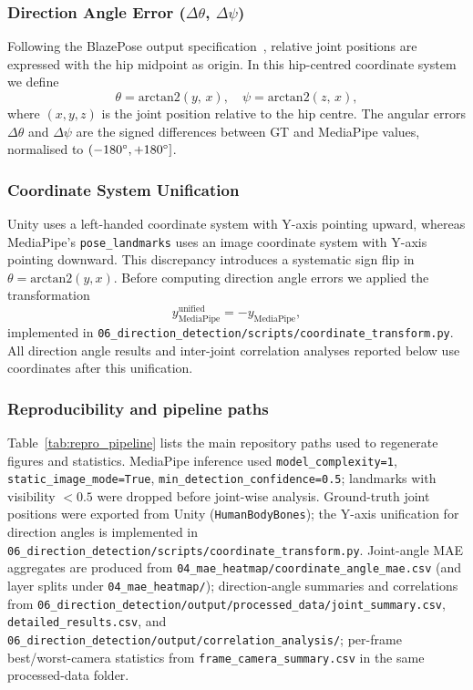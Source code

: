\documentclass[twocolumn]{article}
\begin{document}
\subsubsection{Direction Angle Error ($\Delta\theta$, $\Delta\psi$)}

Following the BlazePose output specification~\cite{blazepose}, relative
joint positions are expressed with the hip midpoint as origin. In this
hip-centred coordinate system we define
\[
  \theta = \mathrm{arctan2}(y,\,x), \quad
  \psi   = \mathrm{arctan2}(z,\,x),
\]
where $(x,y,z)$ is the joint position relative to the hip centre.
The angular errors $\Delta\theta$ and $\Delta\psi$ are the signed
differences between GT and MediaPipe values, normalised to
$(-180\degree{}, +180\degree{}]$.

\subsubsection{Coordinate System Unification}

Unity uses a left-handed coordinate system with Y-axis pointing
upward, whereas MediaPipe's \texttt{pose\_landmarks} uses an image
coordinate system with Y-axis pointing downward. This discrepancy
introduces a systematic sign flip in $\theta = \mathrm{arctan2}(y,x)$.
Before computing direction angle errors we applied the transformation
\[
  y_{\text{MediaPipe}}^{\text{unified}} = -y_{\text{MediaPipe}},
\]
implemented in
\texttt{06\_direction\_detection/scripts/coordinate\_transform.py}.
All direction angle results and inter-joint correlation analyses reported
below use coordinates after this unification.

\subsubsection{Reproducibility and pipeline paths}

Table~\ref{tab:repro_pipeline} lists the main repository paths used to
regenerate figures and statistics. MediaPipe inference used
\texttt{model\_complexity=1}, \texttt{static\_image\_mode=True},
\texttt{min\_detection\_confidence=0.5}; landmarks with visibility
$<\!0.5$ were dropped before joint-wise analysis. Ground-truth joint
positions were exported from Unity (\texttt{HumanBodyBones}); the
Y-axis unification for direction angles is implemented in
\texttt{06\_direction\_detection/scripts/coordinate\_transform.py}.
Joint-angle MAE aggregates are produced from
\texttt{04\_mae\_heatmap/coordinate\_angle\_mae.csv} (and layer splits
under \texttt{04\_mae\_heatmap/}); direction-angle summaries and
correlations from
\texttt{06\_direction\_detection/output/processed\_data/joint\_summary.csv},
\texttt{detailed\_results.csv}, and
\texttt{06\_direction\_detection/output/correlation\_analysis/}; per-frame
best/worst-camera statistics from
\texttt{frame\_camera\_summary.csv} in the same processed-data folder.
\end{document}
